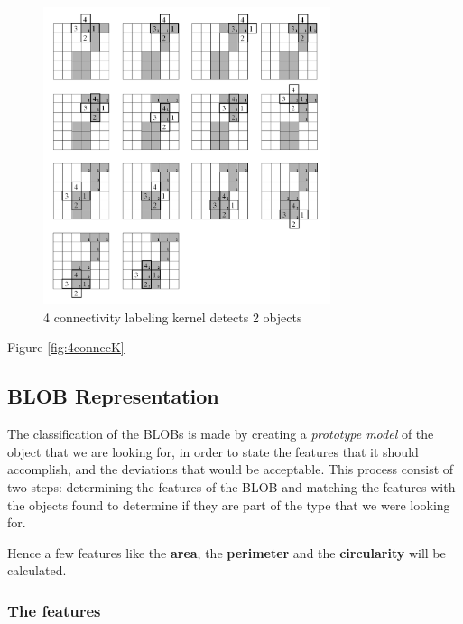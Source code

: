 \begin{figure}[htbp]
\centering
\includegraphics[width=0.75\textwidth]{Pictures/Theory/4connec_kernel.png}
\caption{4 connectivity labeling kernel detects 2 objects}
\label{fig:4connecK}
\end{figure}


Figure \eqref{fig:4connecK}

\subsection{BLOB Representation}
The classification of the BLOBs is made by creating a \textit{prototype model} of the object that we are looking for, in order to state the features that it should accomplish, and the deviations that would be acceptable. This process consist of two steps: determining the features of the BLOB and matching the features with the objects found to determine if they are part of the type that we were looking for.

Hence a few features like the \textbf{area}, the \textbf{perimeter} and the \textbf{circularity} will be calculated.
\subsubsection{The features}

